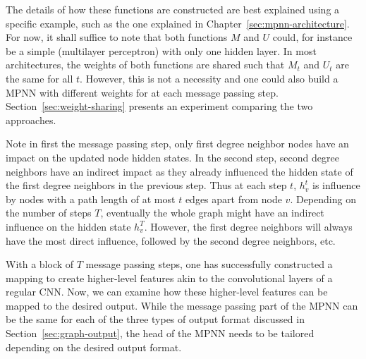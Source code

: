 The details of how these functions are constructed are best explained using a specific example, such as the one explained in Chapter~\ref{sec:mpnn-architecture}.
For now, it shall suffice to note that both functions $M$ and $U$ could, for instance be a simple  (multilayer perceptron) with only one hidden layer. In most architectures, the weights of both functions are shared such that $M_t$ and $U_t$ are the same for all $t$. However, this is not a necessity and one could also build a MPNN with different weights for at each message passing step. Section~\ref{sec:weight-sharing} presents an experiment comparing the two approaches.

Note in first the message passing step, only first degree neighbor nodes have an impact on the updated node hidden states. In the second step, second degree neighbors have an indirect impact as they already influenced the hidden state of the first degree neighbors in the previous step. Thus at each step $t$, $h_v^t$ is influence by nodes with a path length of at most $t$ edges apart from node $v$. Depending on the number of steps $T$, eventually the whole graph might have an indirect influence on the hidden state $h_v^T$. However, the first degree neighbors will always have the most direct influence, followed by the second degree neighbors, etc.

With a block of $T$ message passing steps, one has successfully constructed a mapping to create higher-level features akin to the convolutional layers of a regular CNN. Now, we can examine how these higher-level features can be mapped to the desired output. While the message passing part of the MPNN can be the same for each of the three types of output format discussed in Section~\ref{sec:graph-output}, the head of the MPNN needs to be tailored depending on the desired output format.

